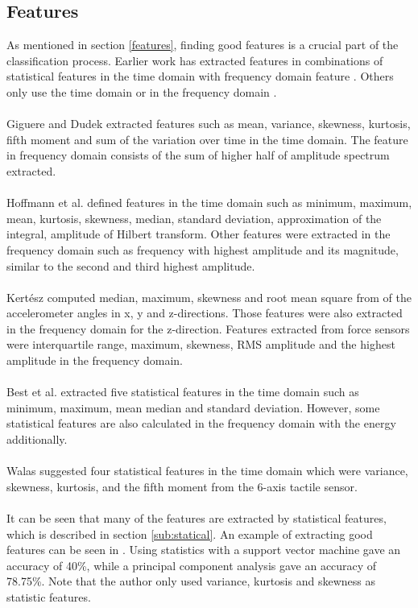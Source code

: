 \documentclass[USenglish]{ifimaster}  %
\begin{document}
\subsection{Features} \label{sub:relatedfeatures}
As mentioned in section \ref{features}, finding good features is a crucial part of the classification process. Earlier work has extracted features in combinations of statistical features in the time domain with frequency domain feature \cite{5152662,Giguere2009,5509309}. Others only use the time domain \cite{walastactile} or in the frequency domain \cite{4543710} \cite{5979766}.
\\
\\
Giguere and Dudek \cite{5152662} extracted features such as mean, variance, skewness, kurtosis, fifth moment and sum of the variation over time in the time domain. The feature in frequency domain consists of the sum of higher half of amplitude spectrum extracted.
\\
\\
Hoffmann et al. \cite{Hoffmann20141790} defined features in the time domain such as minimum, maximum, mean, kurtosis, skewness, median, standard deviation, approximation of the integral, amplitude of Hilbert transform. Other features were extracted in the frequency domain such as frequency with highest amplitude and its magnitude, similar to the second and third highest amplitude. 
\\
\\
Kertész \cite{7387710} computed median, maximum, skewness and root mean square from of the accelerometer angles in x, y and z-directions. Those features were also extracted in the frequency domain for the z-direction. Features extracted from force sensors were interquartile range, maximum, skewness, RMS amplitude and the highest amplitude in the frequency domain.
\\
\\
Best et al.\cite{26b23e912c654fe4b7478fd910130195} extracted five statistical features in the time domain such as minimum, maximum, mean median and standard deviation. However, some statistical features are also calculated in the frequency domain with the energy additionally.
\\
\\
Walas \cite{walastactile} suggested four statistical features in the time domain which were variance, skewness, kurtosis, and the fifth moment from the 6-axis tactile sensor. 
\\
\\
It can be seen that many of the features are extracted by statistical features, which is described in section \ref{sub:statical}. An example of extracting good features can be seen in \cite{5602459}. Using statistics with a support vector machine gave an accuracy of 40\%, while a principal component analysis gave an accuracy of 78.75\%. Note that the author only used variance, kurtosis and skewness as statistic features.
	
\end{document}

